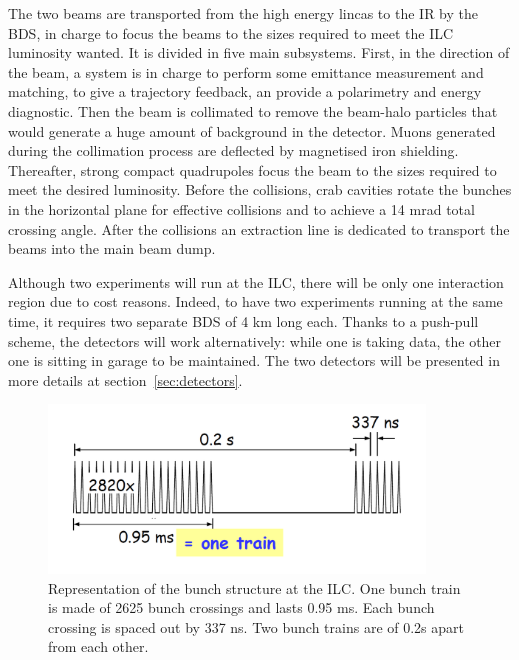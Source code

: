     The two beams are transported from the high energy lincas to the \gls{IR} by the \gls{BDS}, in charge to focus the beams to the sizes required to meet the \gls{ILC} luminosity wanted.
    It is divided in five main subsystems. 
    First, in the direction of the beam, a system is in charge to perform some emittance measurement and matching, to give a trajectory feedback, an provide a polarimetry and energy diagnostic. 
    Then the beam is collimated to remove the beam-halo particles that would generate a huge amount of background in the detector.
    Muons generated during the collimation process are deflected by magnetised iron shielding.
    Thereafter, strong compact quadrupoles focus the beam to the sizes required to meet the desired luminosity. 
    Before the collisions, crab cavities rotate the bunches in the horizontal plane for effective collisions and to achieve a 14 mrad total crossing angle.
    After the collisions an extraction line is dedicated to transport the beams into the main beam dump.

    Although two experiments will run at the \gls{ILC}, there will be only one interaction region due to cost reasons.
    Indeed, to have two experiments running at the same time, it requires two separate \gls{BDS} of 4 km long each.
    Thanks to a push-pull scheme, the detectors will work alternatively: while one is taking data, the other one is sitting in garage to be maintained.
    The two detectors will be presented in more details at section~\ref{sec:detectors}.
    
    \begin{figure}[!h]
      \centering
      \includegraphics[width = 10cm]{Pictures/ILC/bunch.png}
      \caption{Representation of the bunch structure at the ILC. One bunch train is made of 2625 bunch crossings and lasts 0.95 ms. Each bunch crossing is spaced out by 337 ns. Two bunch trains are of 0.2s apart from each other.\cite{Li2010}}
      \label{fig:bunches}
    \end{figure}

